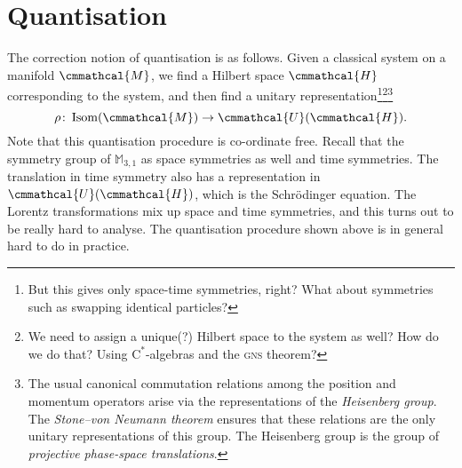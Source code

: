 \documentclass[a4 paper, 12pt]{book}
\renewcommand{\mathcal}{\cmmathcal}
\theoremstyle{definition}
\newcommand{\mm}{\mathbb{M}}
\newcommand{\hilbert}{\mathcal{H}}
\newcommand{\unitary}{\mathcal{U}}
\newcommand{\man}{\mathcal{M}}
\DeclareMathOperator{\isom}{Isom}
\newcommand{\mink}{\mm_{3,1}}
\begin{document}
	\section{Quantisation}

	The correction notion of quantisation is as follows. Given a classical system on a manifold \(\man\), we find a Hilbert space \(\hilbert\) corresponding to the system, and then find a unitary representation\footnote{But this gives only space-time symmetries, right? What about symmetries such as swapping identical particles?}\footnote{We need to assign a unique(?) Hilbert space to the system as well? How do we do that? Using \(\mathrm{C}^*\)-algebras and the \textsc{gns} theorem?}\footnote{The usual canonical commutation relations among the position and momentum operators arise via the representations of the \textit{Heisenberg group}. The \textit{Stone--von Neumann theorem} ensures that these relations are the only unitary representations of this group. The Heisenberg group is the group of \textit{projective phase-space translations}.}
	\begin{equation*}
	    \rho \colon \isom(\man) \rightarrow \unitary(\hilbert).
	\end{equation*}
	Note that this quantisation procedure is co-ordinate free. Recall that the symmetry group of \(\mink\) as space symmetries as well and time symmetries. The translation in time symmetry also has a representation in \(\unitary(\hilbert)\), which is the Schr\"odinger equation. The Lorentz transformations mix up space and time symmetries, and this turns out to be really hard to analyse. The quantisation procedure shown above is in general hard to do in practice.

	\nocite{*}
	\printbibliography[heading=bibintoc]
	\printindex
\end{document}
